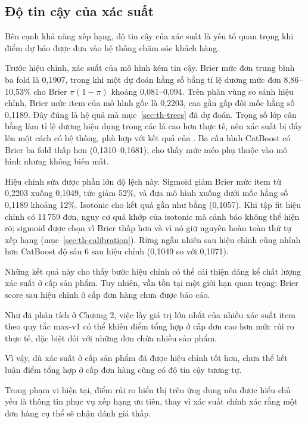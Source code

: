\documentclass[12pt,a4paper]{report}
\begin{document}
\subsection{Độ tin cậy của xác suất}\label{sec:analysis-calibration}

Bên cạnh khả năng xếp hạng, độ tin cậy của xác suất là yếu tố quan trọng khi điểm dự báo được đưa vào hệ thống chăm sóc khách hàng.

Trước hiệu chỉnh, xác suất của mô hình kém tin cậy. Brier mức đơn trung bình ba fold là 0,1907, trong khi một dự đoán hằng số bằng tỉ lệ dương mức đơn 8,86--10,53\% cho Brier $\pi(1-\pi)$ khoảng 0,081--0,094. Trên phân vùng so sánh hiệu chỉnh, Brier mức item của mô hình gốc là 0,2203, cao gần gấp đôi mốc hằng số 0,1189. Đây đúng là hệ quả mà mục~\ref{sec:th-trees} đã dự đoán. Trọng số lớp cân bằng làm tỉ lệ dương hiệu dụng trong các lá cao hơn thực tế, nên xác suất bị đẩy lên một cách có hệ thống, phù hợp với kết quả của \textcite{vandengoorbergh2022}. Ba cấu hình CatBoost có Brier ba fold thấp hơn (0,1310--0,1681), cho thấy mức méo phụ thuộc vào mô hình nhưng không biến mất.

Hiệu chỉnh sửa được phần lớn độ lệch này. Sigmoid giảm Brier mức item từ 0,2203 xuống 0,1049, tức giảm 52\%, và đưa mô hình xuống dưới mốc hằng số 0,1189 khoảng 12\%. Isotonic cho kết quả gần như bằng (0,1057). Khi tập fit hiệu chỉnh có 11\,759 đơn, nguy cơ quá khớp của isotonic mà \textcite{niculescumizil2005} cảnh báo không thể hiện rõ; sigmoid được chọn vì Brier thấp hơn và vì nó giữ nguyên hoàn toàn thứ tự xếp hạng (mục~\ref{sec:th-calibration}). Rừng ngẫu nhiên sau hiệu chỉnh cũng nhỉnh hơn CatBoost độ sâu 6 sau hiệu chỉnh (0,1049 so với 0,1071).

Những kết quả này cho thấy bước hiệu chỉnh có thể cải thiện đáng kể chất lượng xác suất ở cấp sản phẩm. Tuy nhiên, vẫn tồn tại một giới hạn quan trọng: Brier score sau hiệu chỉnh ở cấp đơn hàng chưa được báo cáo.

Như đã phân tích ở Chương 2, việc lấy giá trị lớn nhất của nhiều xác suất item theo quy tắc max-v1 có thể khiến điểm tổng hợp ở cấp đơn cao hơn mức rủi ro thực tế, đặc biệt đối với những đơn chứa nhiều sản phẩm.

Vì vậy, dù xác suất ở cấp sản phẩm đã được hiệu chỉnh tốt hơn, chưa thể kết luận điểm tổng hợp ở cấp đơn hàng cũng có độ tin cậy tương tự.

Trong phạm vi hiện tại, điểm rủi ro hiển thị trên ứng dụng nên được hiểu chủ yếu là thông tin phục vụ xếp hạng ưu tiên, thay vì xác suất chính xác rằng một đơn hàng cụ thể sẽ nhận đánh giá thấp.
\end{document}
